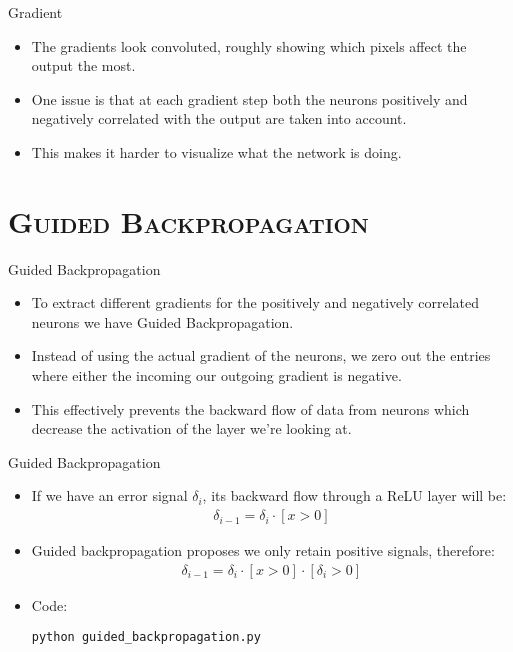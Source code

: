 \begin{frame}{Gradient}
	\begin{itemize}
		\item The gradients look convoluted, roughly showing which pixels affect the output the most.
		\item One issue is that at each gradient step both the neurons positively and negatively correlated with the output are taken into account.
		\item This makes it harder to visualize what the network is doing.
	\end{itemize}
\end{frame}

\section{\scshape Guided Backpropagation}
\begin{frame}{Guided Backpropagation}
	\begin{itemize}
		\item To extract different gradients for the positively and negatively correlated neurons we have Guided Backpropagation.
		\item Instead of using the actual gradient of the neurons, we zero out the entries where either the incoming our outgoing gradient is negative.
		\item This effectively prevents the backward flow of data from neurons which decrease the activation of the layer we're looking at.
	\end{itemize}
\end{frame}

\begin{frame}{Guided Backpropagation}
	\begin{itemize}
		\item If we have an error signal $\delta_i$, its backward flow through a ReLU layer will be:
		\begin{gather*}
			\delta_{i-1} = \delta_i \cdot [x>0]
		\end{gather*}
		\item Guided backpropagation proposes we only retain positive signals, therefore:
		\begin{gather*}
			\delta_{i-1} = \delta_i \cdot [x>0] \cdot [\delta_i > 0]
		\end{gather*}
		\item<2-> Code:
		\begin{center}
			{\smaller \texttt{python guided\_backpropagation.py}}
		\end{center}
	\end{itemize}
\end{frame}

